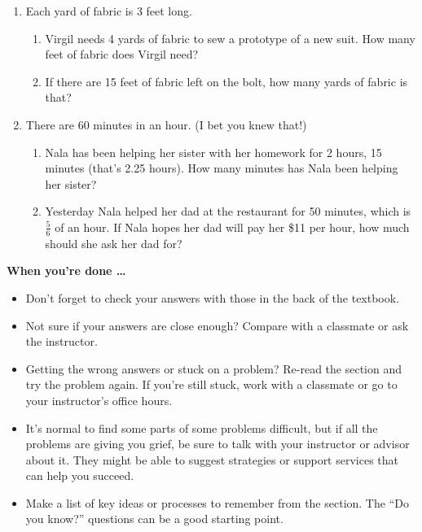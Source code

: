 \begin{enumerate}
\item Each yard of fabric is 3 feet long. 
\begin{enumerate}
\item Virgil needs 4 yards of fabric to sew a prototype of a new suit.  How many feet of fabric does Virgil need?
\item If there are 15 feet of fabric left on the bolt, how many yards of fabric is that?
\end{enumerate}

\item There are 60 minutes in an hour. (I bet you knew that!)
\begin{enumerate}
\item Nala has been helping her sister with her homework for 2 hours, 15 minutes (that's 2.25 hours).  How many minutes has Nala been helping her sister?
\item Yesterday Nala helped her dad at the restaurant for 50 minutes, which is $\frac{5}{6}$ of an hour.  If Nala hopes her dad will pay her \$11 per hour, how much should she ask her dad for? 
\end{enumerate}





\end{enumerate}

\bigskip

\noindent \textbf{When you're done \ldots}

\begin{itemize}
\item Don't forget to check your answers with those in the back of the textbook. 
\item Not sure if your answers are close enough? Compare with a classmate or ask the instructor.  
\item Getting the wrong answers or stuck on a problem?  Re-read the section and try the problem again.   If you're still stuck, work with a classmate or go to your instructor's office hours.
\item It's normal to find some parts of some problems difficult, but if all the problems are giving you grief, be sure to talk with your instructor or advisor about it.  They might be able to suggest strategies or support services that can help you succeed.
\item Make a list of key ideas or processes to remember from the section.  The ``Do you know?'' questions can be a good starting point.
\end{itemize}

